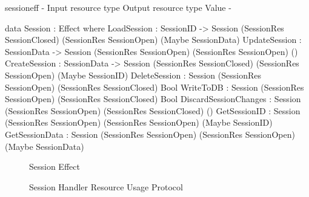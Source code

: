 \begin{SaveVerbatim}{sessioneff}
{-                        { Input resource type }            { Output resource type }   { Value }        -}

data Session : Effect where
  LoadSession           : SessionID -> 
                          Session (SessionRes SessionClosed) (SessionRes SessionOpen)   (Maybe SessionData)
  UpdateSession         : SessionData -> 
                          Session (SessionRes SessionOpen)   (SessionRes SessionOpen)   ()
  CreateSession         : SessionData -> 
                          Session (SessionRes SessionClosed) (SessionRes SessionOpen)   (Maybe SessionID)
  DeleteSession         : Session (SessionRes SessionOpen)   (SessionRes SessionClosed) Bool 
  WriteToDB             : Session (SessionRes SessionOpen)   (SessionRes SessionClosed) Bool
  DiscardSessionChanges : Session (SessionRes SessionOpen)   (SessionRes SessionClosed) ()
  GetSessionID          : Session (SessionRes SessionOpen)   (SessionRes SessionOpen)   (Maybe SessionID)
  GetSessionData        : Session (SessionRes SessionOpen)   (SessionRes SessionOpen)   (Maybe SessionData)
\end{SaveVerbatim}

\begin{figure*}[t]
\begin{center}
\end{center}
\caption{Session Effect}
\label{fig:sessioneffect}
\end{figure*}

\begin{figure}[htpb!]
\centering
{}
\caption{Session Handler Resource Usage Protocol}
\label{fig:sessionstates}
\end{figure}

